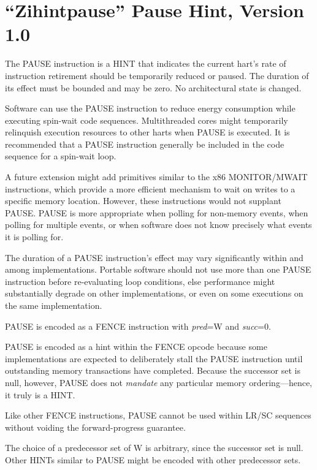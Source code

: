 \chapter{``Zihintpause'' Pause Hint, Version 1.0}
\label{chap:zihintpause}

The PAUSE instruction is a HINT that indicates the current hart's rate of
instruction retirement should be temporarily reduced or paused.  The duration of its
effect must be bounded and may be zero.  No architectural state is changed.

\begin{commentary}
Software can use the PAUSE instruction to reduce energy consumption while
executing spin-wait code sequences.  Multithreaded cores might temporarily
relinquish execution resources to other harts when PAUSE is executed.  It is recommended that a PAUSE instruction generally be included in the code sequence for a spin-wait loop.

A future extension might add primitives similar to the x86 MONITOR/MWAIT
instructions, which provide a more efficient mechanism to wait on writes to
a specific memory location.  However, these instructions would not supplant PAUSE.  PAUSE is more appropriate when polling for non-memory events, when polling for
multiple events, or when software does not know precisely what events it is
polling for.

The duration of a PAUSE instruction's effect may vary significantly within and
among implementations.  Portable software should not use more than one PAUSE instruction before
re-evaluating loop conditions, else performance might substantially degrade on
other implementations, or even on some executions on the same implementation.
\end{commentary}

PAUSE is encoded as a FENCE instruction with {\em pred}=W and {\em succ}=0.

\begin{commentary}
PAUSE is encoded as a hint within the FENCE opcode because some
implementations are expected to deliberately stall the PAUSE instruction until outstanding
memory transactions have completed.  Because the successor set is null, however, PAUSE does not {\em mandate} any
particular memory ordering---hence, it truly is a HINT.

Like other FENCE instructions, PAUSE cannot be used within LR/SC sequences
without voiding the forward-progress guarantee.

The choice of a predecessor set of W is arbitrary, since the successor set is
null.  Other HINTs similar to PAUSE might be encoded with other predecessor sets.
\end{commentary}

